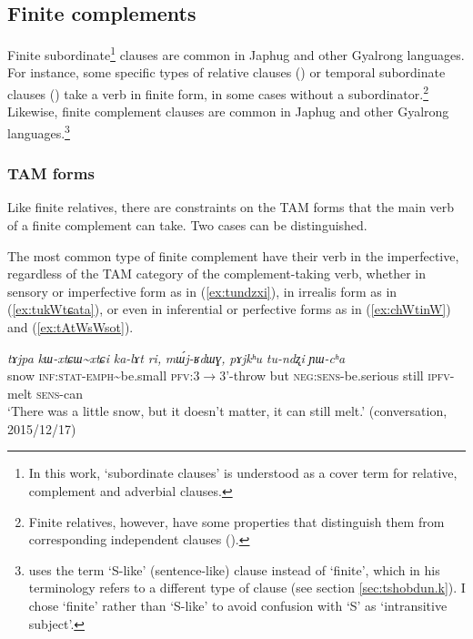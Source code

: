 \documentclass[oneside,a4paper,11pt]{article}
\newcommand{\ipa}[1]{\textit{\phon#1}}
\newcommand{\tld}{\textasciitilde{}}
\begin{document}
 \subsection{Finite complements} \label{sec:finite}
Finite subordinate\footnote{In this work, `subordinate clauses' is understood as a cover term for relative, complement and adverbial clauses.} clauses are common in Japhug and other Gyalrong languages. For instance, some specific types of relative clauses (\citealt{jackson06guanxiju, jacques16relatives}) or temporal subordinate clauses (\citealt{jacques14linking}) take a verb in finite form, in some cases without a subordinator.\footnote{Finite relatives, however, have some properties that distinguish them from corresponding independent clauses (\citealt[18-21]{jacques16relatives}).} Likewise, finite complement clauses are common in Japhug and other Gyalrong languages.\footnote{\citet[475-7]{sun12complementation} uses the term `S-like' (sentence-like) clause instead of `finite', which in his terminology refers to a different type of clause (see section \ref{sec:tshobdun.k}). I chose `finite' rather than `S-like' to avoid confusion with `S' as  `intransitive subject'. }


\subsubsection{TAM forms} \label{sec:TAM.finite}
Like finite relatives, there are constraints on the TAM forms that the main verb of a finite complement can take. Two cases can be distinguished.

The most common type of finite complement have their verb in the imperfective, regardless of the TAM category of the complement-taking verb, whether in sensory or imperfective form as in (\ref{ex:tundzxi}), in irrealis form as in (\ref{ex:tukWtɕata}), or even in inferential or perfective forms as in (\ref{ex:chWtinW}) and (\ref{ex:tAtWsWsot}).

\begin{exe}
\ex \label{ex:tundzxi}
\gll 
\ipa{tɤjpa} 	\ipa{kɯ-xtɕɯ\tld{}xtɕi} 	\ipa{ka-lɤt} 	\ipa{ri,} 	\ipa{mɯ́j-ʁdɯɣ,} 	\ipa{pɤjkʰu} 	\ipa{tu-ndʐi} 	\ipa{ɲɯ-cʰa} \\
snow \textsc{inf:stat-emph}\tld{}be.small \textsc{pfv}:3$\rightarrow$3'-throw but \textsc{neg:sens}-be.serious still \textsc{ipfv}-melt \textsc{sens}-can \\
\glt `There was a little snow, but it doesn't matter, it can still melt.' (conversation, 2015/12/17)
\end{exe}
\end{document}

